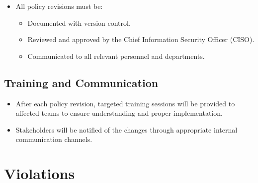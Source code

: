 \begin{itemize}
    \item All policy revisions must be:

\begin{itemize}
    \item Documented with version control.
    
    \item Reviewed and approved by the Chief Information Security Officer (CISO).
    
    \item Communicated to all relevant personnel and departments.

\end{itemize}
\end{itemize}
\subsection{Training and Communication}
\begin{itemize}
    \item After each policy revision, targeted training sessions will be provided to affected teams to ensure understanding and proper implementation.
    
    \item Stakeholders will be notified of the changes through appropriate internal communication channels.

\end{itemize}



\section{Violations}

